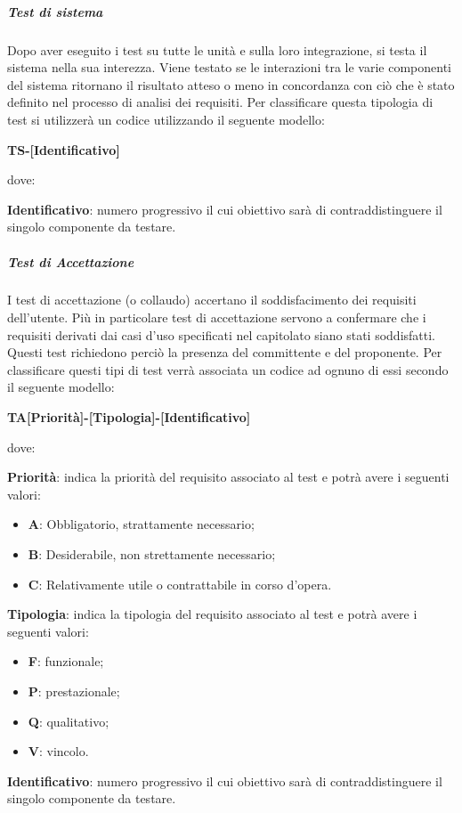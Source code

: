			\subparagraph*{Test di sistema}
				Dopo aver eseguito i test su tutte le unità e sulla loro integrazione, si testa il sistema nella sua interezza. Viene testato se le interazioni tra le varie componenti del sistema ritornano il risultato atteso o meno in concordanza con ciò che è stato definito nel processo di analisi dei requisiti.
				Per classificare questa tipologia di test si utilizzerà un codice utilizzando il seguente modello:     

		        \begin{center}
		        \textbf{TS-[Identificativo]}
		        \end{center}
		        dove:

		        \textbf{Identificativo}: numero progressivo il cui obiettivo sarà di contraddistinguere il singolo componente da testare.

			\subparagraph*{Test di Accettazione}
            	I test di accettazione (o collaudo) accertano il soddisfacimento dei requisiti dell'utente.
                Più in particolare test di accettazione servono a confermare che i requisiti derivati dai casi d'uso specificati nel capitolato siano stati soddisfatti. Questi test richiedono perciò la presenza del committente e del proponente.  
                Per classificare questi tipi di test verrà associata un codice ad ognuno di essi secondo il seguente modello:
                
                \begin{center}
                \textbf{TA[Priorità]-[Tipologia]-[Identificativo]}
                \end{center}
                dove: 
                
                \textbf{Priorità}: indica la priorità del requisito associato al test e potrà avere i seguenti valori:
                \begin{itemize}
                    \item \textbf{A}: Obbligatorio, strattamente necessario;
                    \item \textbf{B}: Desiderabile, non strettamente necessario;
                    \item \textbf{C}: Relativamente utile o contrattabile in corso d'opera. 
                 \end{itemize} 
                 \textbf{Tipologia}: indica la tipologia del requisito associato al test e potrà avere i seguenti valori:
                 \begin{itemize}
                    \item \textbf{F}: funzionale;
                    \item \textbf{P}: prestazionale;
                    \item \textbf{Q}: qualitativo;
                    \item \textbf{V}: vincolo.
                 \end{itemize}
                \textbf{Identificativo}: numero progressivo il cui obiettivo sarà di contraddistinguere il singolo componente da testare.
